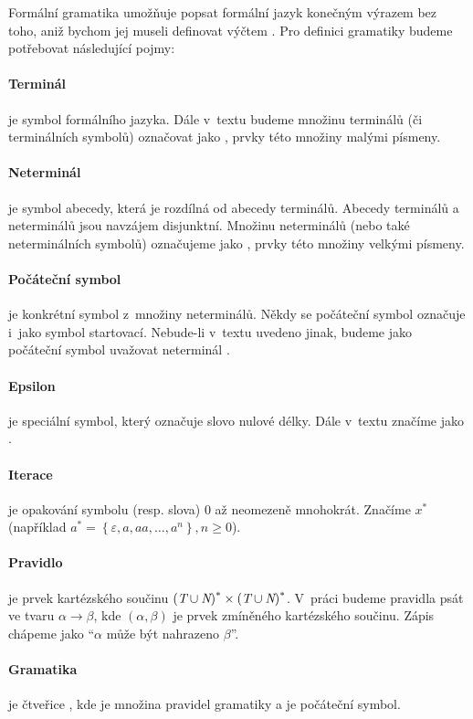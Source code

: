 		Formální gramatika umožňuje popsat formální jazyk konečným výrazem bez toho, aniž bychom jej museli definovat výčtem \cite{Meduna:2014:FLC:2636678}. Pro definici gramatiky budeme potřebovat následující pojmy:
		
		\paragraph{Terminál}
		je symbol formálního jazyka. Dále v~textu budeme množinu terminálů (či terminálních symbolů) označovat jako , prvky této množiny malými písmeny.
		\paragraph{Neterminál}
		je symbol abecedy, která je rozdílná od abecedy terminálů. Abecedy terminálů a neterminálů jsou navzájem disjunktní. Množinu neterminálů (nebo také neterminálních symbolů) označujeme jako , prvky této množiny velkými písmeny.
		\paragraph{Počáteční symbol}
		je konkrétní symbol z~množiny neterminálů. Někdy se počáteční symbol označuje i~jako symbol startovací. Nebude-li v~textu uvedeno jinak, budeme jako počáteční symbol uvažovat neterminál .
		\paragraph{Epsilon}
		je speciální symbol, který označuje slovo nulové délky. Dále v~textu značíme jako \Eps.
		\paragraph{Iterace}
		je opakování symbolu (resp. slova) 0 až neomezeně mnohokrát. Značíme $x^{\ast}$ (například $a^{\ast} = \left\{ \varepsilon, a, aa, \dots, a^n \right\}, n\ge 0  $).
		\paragraph{Pravidlo}
		je prvek kartézského součinu 
		${(\textit{T}\cup\textit{N})}^{\ast}
			\times
		{(\textit{T}\cup\textit{N})}^{\ast}$.
		V~práci budeme pravidla psát ve tvaru $\alpha\rightarrow\beta$, kde $(\alpha,\beta)$ je prvek zmíněného kartézského součinu. Zápis chápeme jako \enquote{$\alpha$ může být nahrazeno $\beta$}.
		\paragraph{Gramatika}
		je čtveřice \GrammarDef, kde  je množina pravidel gramatiky a  je počáteční symbol.
		
